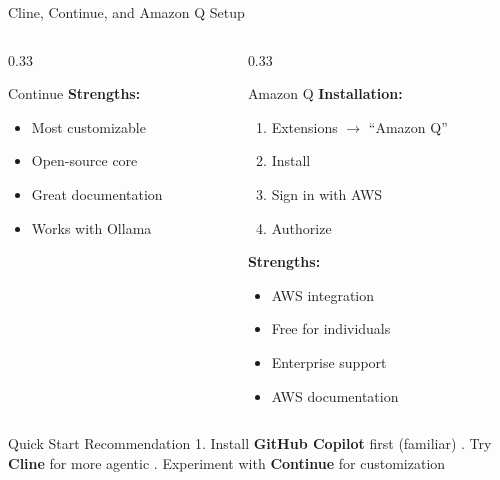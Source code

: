 \documentclass[aspectratio=169,11pt]{beamer}
\begin{document}
\begin{frame}{Cline, Continue, and Amazon Q Setup}
\begin{columns}[T]
\begin{column}{0.33\textwidth}
\begin{block}{Continue}
                \vspace{0.2cm}
                \textbf{Strengths:}
                \begin{itemize}
                    \item Most customizable
                    \item Open-source core
                    \item Great documentation
                    \item Works with Ollama
                \end{itemize}
            \end{block}
        \end{column}
        \begin{column}{0.33\textwidth}
            \begin{block}{Amazon Q}
                \textbf{Installation:}
                \begin{enumerate}
                    \item Extensions $\rightarrow$ ``Amazon Q''
                    \item Install
                    \item Sign in with AWS
                    \item Authorize
                \end{enumerate}

                \vspace{0.2cm}
                \textbf{Strengths:}
                \begin{itemize}
                    \item AWS integration
                    \item Free for individuals
                    \item Enterprise support
                    \item AWS documentation
                \end{itemize}
            \end{block}
        \end{column}
    \end{columns}

    \vspace{0.2cm}
    \begin{exampleblock}{Quick Start Recommendation}
        1. Install \textbf{GitHub Copilot} first (familiar) . Try \textbf{Cline} for more agentic . Experiment with \textbf{Continue} for customization
    \end{exampleblock}

\end{frame}
\end{document}
